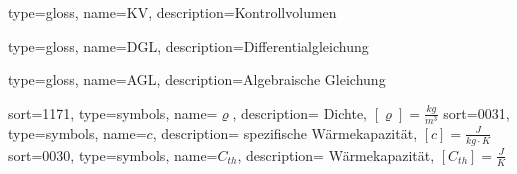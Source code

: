 
\makeglossaries

{
  type=gloss,
  name=KV,
  description={Kontrollvolumen}
}

{
  type=gloss,
  name=DGL,
  description={Differentialgleichung}
}

{
  type=gloss,
  name=AGL,
  description={Algebraische Gleichung}
}

{
  sort=1171,
  type=symbols,
  name={\ensuremath{\varrho}},
  description={
    Dichte, $[\varrho] = \frac{kg}{m^3}$
  }
}
{
  sort=0031,
  type=symbols,
  name={\ensuremath{c}},
  description={
    spezifische Wärmekapazität, $[c] = \frac{J}{kg\cdot K}$
  }
}
{
  sort=0030,
  type=symbols,
  name={\ensuremath{C_{th}}},
  description={
    Wärmekapazität, $[C_{th}] = \frac{J}{K}$
  }
}
